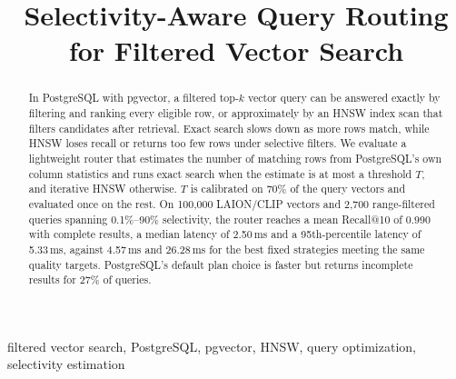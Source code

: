 \documentclass[conference]{IEEEtran}
\begin{document}

\title{Selectivity-Aware Query Routing\\for Filtered Vector Search}

\author{
}

\maketitle

\begin{abstract}
In PostgreSQL with pgvector, a filtered top-$k$ vector query can be answered exactly by filtering and ranking every
eligible row, or approximately by an HNSW index scan that filters candidates after retrieval. Exact search slows down
as more rows match, while HNSW loses recall or returns too few rows under selective filters. We evaluate a lightweight
router that estimates the number of matching rows from PostgreSQL's own column statistics and runs exact search when
the estimate is at most a threshold $T$, and iterative HNSW otherwise. $T$ is calibrated on 70\% of the query vectors
and evaluated once on the rest. On 100{,}000 LAION/CLIP vectors and 2{,}700 range-filtered queries spanning
0.1\%--90\% selectivity, the router reaches a mean Recall@10 of 0.990 with complete results, a median latency of
2.50\,ms and a 95th-percentile latency of 5.33\,ms, against 4.57\,ms and 26.28\,ms for the best fixed strategies
meeting the same quality targets. PostgreSQL's default plan choice is faster but returns incomplete results for 27\%
of queries.
\end{abstract}

\begin{IEEEkeywords}
filtered vector search, PostgreSQL, pgvector, HNSW, query optimization, selectivity estimation
\end{IEEEkeywords}











\end{document}
